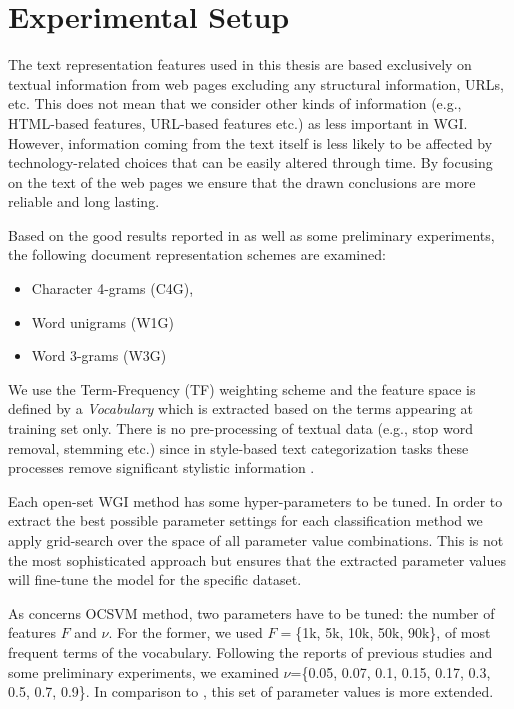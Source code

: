 \section{Experimental Setup}\label{chap:noise:sec:experimental_setup}

The text representation features used in this thesis are based exclusively on textual information from web pages excluding any structural information, URLs, etc. This does not mean that we consider other kinds of information (e.g., HTML-based features, URL-based features etc.) as less important in WGI. However, information coming from the text itself is less likely to be affected by technology-related choices that can be easily altered through time. By focusing on the text of the web pages we ensure that the drawn conclusions are more reliable and long lasting.

Based on the good results reported in \parencite{sharoff2010web,kanaris2009learning,Asheghi2015} as well as some preliminary experiments, the following document representation schemes are examined: 

\begin{itemize}
    \item Character 4-grams (C4G), 
    \item Word unigrams (W1G)
    \item Word 3-grams (W3G)
\end{itemize}

We use the Term-Frequency (TF) weighting scheme and the feature space is defined by a \textit{Vocabulary} which is extracted based on the terms appearing at training set only. There is no pre-processing of textual data (e.g., stop word removal, stemming etc.) since in style-based text categorization tasks these processes remove significant stylistic information .

Each open-set WGI method has some hyper-parameters to be tuned. In order to extract the best possible parameter settings for each classification method we apply grid-search over the space of all parameter value combinations. This is not the most sophisticated approach but ensures that the extracted parameter values will fine-tune the model for the specific dataset.

As concerns OCSVM method, two parameters have to be tuned: the number of features $F$ and $\nu$. For the former, we used $F=$\{1k, 5k, 10k, 50k, 90k\}, of most frequent terms of the vocabulary. Following the reports of previous studies \parencite{scholkopf1999estimating} and some preliminary experiments, we examined $\nu$=\{0.05, 0.07, 0.1, 0.15, 0.17, 0.3, 0.5, 0.7, 0.9\}. In comparison to \parencite{pritsos2013open}, this set of parameter values is more extended. 

